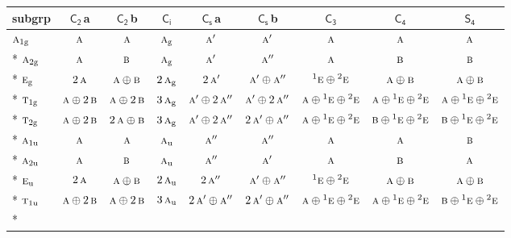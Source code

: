\documentclass[10pt,a4paper]{article}
\numberwithin{equation}{section}
\newcommand{\grp}[1]{\mathsf{#1}}
\newcommand{\irr}[1]{\text{\normalfont\scshape #1}}
\newcommand{\conjpair}[1]{{}^{#1}}
\newcommand{\ptag}[1]{\mathrm{#1}}
\newcommand{\clsletter}[1]{\,{\scriptsize\color{black!55}#1}}
\begin{document}
{\small\begin{longtable}{@{}lcccccccc@{}}\toprule
subgrp & \href{C2.pdf}{$\grp{C_{2}}$}\clsletter{a} & \href{C2.pdf}{$\grp{C_{2}}$}\clsletter{b} & \href{S2.pdf}{$\grp{C_{i}}$} & \href{C1v.pdf}{$\grp{C_{s}}$}\clsletter{a} & \href{C1v.pdf}{$\grp{C_{s}}$}\clsletter{b} & \href{C3.pdf}{$\grp{C_{3}}$} & \href{C4.pdf}{$\grp{C_{4}}$} & \href{S4.pdf}{$\grp{S_{4}}$}\\\midrule\endhead
\bottomrule\endfoot\endlastfoot
$\irr{a}_{1\ptag{g}}$ & $\irr{a}$ & $\irr{a}$ & $\irr{a}_{\ptag{g}}$ & $\irr{a}'$ & $\irr{a}'$ & $\irr{a}$ & $\irr{a}$ & $\irr{a}$\\*
$\irr{a}_{2\ptag{g}}$ & $\irr{a}$ & $\irr{b}$ & $\irr{a}_{\ptag{g}}$ & $\irr{a}'$ & $\irr{a}''$ & $\irr{a}$ & $\irr{b}$ & $\irr{b}$\\*
$\irr{e}_{\ptag{g}}$ & $2\,\irr{a}$ & $\irr{a}\oplus \irr{b}$ & $2\,\irr{a}_{\ptag{g}}$ & $2\,\irr{a}'$ & $\irr{a}'\oplus \irr{a}''$ & $\conjpair{1}\irr{e}\oplus \conjpair{2}\irr{e}$ & $\irr{a}\oplus \irr{b}$ & $\irr{a}\oplus \irr{b}$\\*
$\irr{t}_{1\ptag{g}}$ & $\irr{a}\oplus 2\,\irr{b}$ & $\irr{a}\oplus 2\,\irr{b}$ & $3\,\irr{a}_{\ptag{g}}$ & $\irr{a}'\oplus 2\,\irr{a}''$ & $\irr{a}'\oplus 2\,\irr{a}''$ & $\irr{a}\oplus \conjpair{1}\irr{e}\oplus \conjpair{2}\irr{e}$ & $\irr{a}\oplus \conjpair{1}\irr{e}\oplus \conjpair{2}\irr{e}$ & $\irr{a}\oplus \conjpair{1}\irr{e}\oplus \conjpair{2}\irr{e}$\\*
$\irr{t}_{2\ptag{g}}$ & $\irr{a}\oplus 2\,\irr{b}$ & $2\,\irr{a}\oplus \irr{b}$ & $3\,\irr{a}_{\ptag{g}}$ & $\irr{a}'\oplus 2\,\irr{a}''$ & $2\,\irr{a}'\oplus \irr{a}''$ & $\irr{a}\oplus \conjpair{1}\irr{e}\oplus \conjpair{2}\irr{e}$ & $\irr{b}\oplus \conjpair{1}\irr{e}\oplus \conjpair{2}\irr{e}$ & $\irr{b}\oplus \conjpair{1}\irr{e}\oplus \conjpair{2}\irr{e}$\\*
$\irr{a}_{1\ptag{u}}$ & $\irr{a}$ & $\irr{a}$ & $\irr{a}_{\ptag{u}}$ & $\irr{a}''$ & $\irr{a}''$ & $\irr{a}$ & $\irr{a}$ & $\irr{b}$\\*
$\irr{a}_{2\ptag{u}}$ & $\irr{a}$ & $\irr{b}$ & $\irr{a}_{\ptag{u}}$ & $\irr{a}''$ & $\irr{a}'$ & $\irr{a}$ & $\irr{b}$ & $\irr{a}$\\*
$\irr{e}_{\ptag{u}}$ & $2\,\irr{a}$ & $\irr{a}\oplus \irr{b}$ & $2\,\irr{a}_{\ptag{u}}$ & $2\,\irr{a}''$ & $\irr{a}'\oplus \irr{a}''$ & $\conjpair{1}\irr{e}\oplus \conjpair{2}\irr{e}$ & $\irr{a}\oplus \irr{b}$ & $\irr{a}\oplus \irr{b}$\\*
$\irr{t}_{1\ptag{u}}$ & $\irr{a}\oplus 2\,\irr{b}$ & $\irr{a}\oplus 2\,\irr{b}$ & $3\,\irr{a}_{\ptag{u}}$ & $2\,\irr{a}'\oplus \irr{a}''$ & $2\,\irr{a}'\oplus \irr{a}''$ & $\irr{a}\oplus \conjpair{1}\irr{e}\oplus \conjpair{2}\irr{e}$ & $\irr{a}\oplus \conjpair{1}\irr{e}\oplus \conjpair{2}\irr{e}$ & $\irr{b}\oplus \conjpair{1}\irr{e}\oplus \conjpair{2}\irr{e}$\\*

\end{longtable}}
\end{document}

